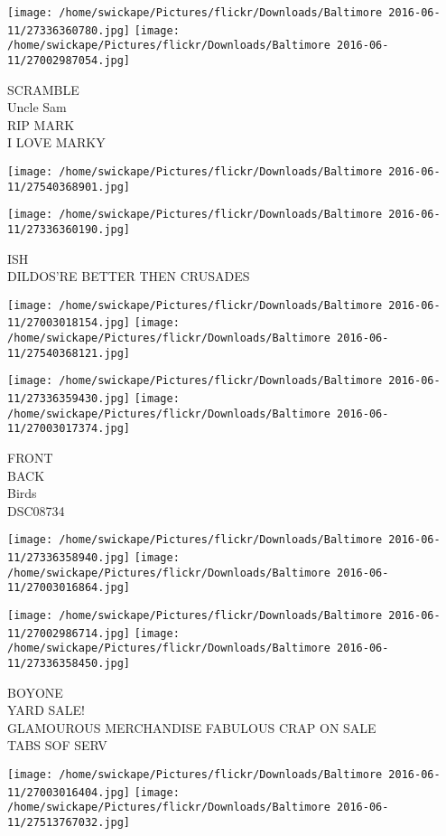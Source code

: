 \documentclass[10pt,letterpaper]{article}
\begin{document}
\texttt{[image: /home/swickape/Pictures/flickr/Downloads/Baltimore 2016-06-11/27336360780.jpg]}
\texttt{[image: /home/swickape/Pictures/flickr/Downloads/Baltimore 2016-06-11/27002987054.jpg]}

SCRAMBLE\\
Uncle Sam\\
RIP MARK\\
I LOVE MARKY
\pagebreak

\texttt{[image: /home/swickape/Pictures/flickr/Downloads/Baltimore 2016-06-11/27540368901.jpg]}

\vspace{0.25in}
\texttt{[image: /home/swickape/Pictures/flickr/Downloads/Baltimore 2016-06-11/27336360190.jpg]}

ISH\\
DILDOS'RE BETTER THEN CRUSADES
\pagebreak

\texttt{[image: /home/swickape/Pictures/flickr/Downloads/Baltimore 2016-06-11/27003018154.jpg]}
\texttt{[image: /home/swickape/Pictures/flickr/Downloads/Baltimore 2016-06-11/27540368121.jpg]}

\texttt{[image: /home/swickape/Pictures/flickr/Downloads/Baltimore 2016-06-11/27336359430.jpg]}
\texttt{[image: /home/swickape/Pictures/flickr/Downloads/Baltimore 2016-06-11/27003017374.jpg]}

FRONT\\
BACK\\
Birds\\
DSC08734
\pagebreak

\texttt{[image: /home/swickape/Pictures/flickr/Downloads/Baltimore 2016-06-11/27336358940.jpg]}
\texttt{[image: /home/swickape/Pictures/flickr/Downloads/Baltimore 2016-06-11/27003016864.jpg]}

\texttt{[image: /home/swickape/Pictures/flickr/Downloads/Baltimore 2016-06-11/27002986714.jpg]}
\texttt{[image: /home/swickape/Pictures/flickr/Downloads/Baltimore 2016-06-11/27336358450.jpg]}

BOYONE\\
YARD SALE!\\
GLAMOUROUS MERCHANDISE FABULOUS CRAP ON SALE\\
TABS SOF SERV
\pagebreak

\texttt{[image: /home/swickape/Pictures/flickr/Downloads/Baltimore 2016-06-11/27003016404.jpg]}
\texttt{[image: /home/swickape/Pictures/flickr/Downloads/Baltimore 2016-06-11/27513767032.jpg]}
\end{document}
